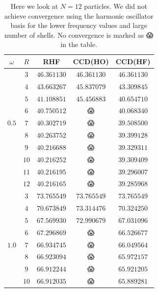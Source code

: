 \documentclass[
    a4paper, aps, twocolumn, floatfix, superscriptaddress,
    nofootinbib]{revtex4-1}
\newcommand{\nan}{{\DejaSans 😱}}
\newcommand{\1}{\mathds{1}}
\begin{document}
        \begin{table}
            \centering
            \caption{Here we look at $N = 12$ particles.  We did not achieve
            convergence using the harmonic oscillator basis for the lower
            frequency values and large number of shells. No convergence is
            marked as {\nan} in the table.}
            \begin{ruledtabular}
                \begin{tabular}{c|c|ccc}
                    $\omega$ & $R$ & RHF & CCD(HO) & CCD(HF) \\
                    \hline
                          & $3$ & $46.361130$ & $46.361130$ & $46.361130$ \\
                          & $4$ & $43.663267$ & $45.837079$ & $43.309845$ \\
                          & $5$ & $41.108851$ & $45.456883$ & $40.654710$ \\
                          & $6$ & $40.750512$ & \nan & $40.068340$ \\
                    $0.5$ & $7$ & $40.302719$ & \nan & $39.508500$ \\
                          & $8$ & $40.263752$ & \nan & $39.399128$ \\
                          & $9$ & $40.216688$ & \nan & $39.329311$ \\
                          & $10$ & $40.216252$ & \nan & $39.309409$ \\
                          & $11$ & $40.216195$ & \nan & $39.296007$ \\
                          & $12$ & $40.216165$ & \nan & $39.285968$ \\
                    \hline
                          & $3$ & $73.765549$ & $73.765549$ & $73.765549$ \\
                          & $4$ & $70.673849$ & $73.314476$ & $70.324250$ \\
                          & $5$ & $67.569930$ & $72.990679$ & $67.031096$ \\
                          & $6$ & $67.296869$ & \nan & $66.526677$ \\
                    $1.0$ & $7$ & $66.934745$ & \nan & $66.049564$ \\
                          & $8$ & $66.923094$ & \nan & $65.972157$ \\
                          & $9$ & $66.912244$ & \nan & $65.921205$ \\
                          & $10$ & $66.912035$ & \nan & $65.889281$ \\

\end{tabular}
\end{ruledtabular}
\end{table}
\end{document}
